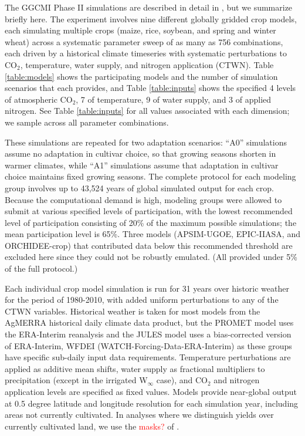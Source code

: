 \documentclass[gmd, manuscript]{copernicus} %
\begin{document}
The GGCMI Phase II simulations are described in detail in \citet{Franke2019a}, but we summarize briefly here. 
The experiment involves nine different globally gridded crop models, each simulating multiple crops (maize, rice, soybean, and spring and winter wheat) across a systematic parameter sweep of as many as 756 combinations, each driven by a historical climate timeseries with systematic perturbations to CO$_2$, temperature, water supply, and nitrogen application (CTWN). 
Table \ref{table:models} shows the participating models and the number of simulation scenarios that each provides, and Table \ref{table:inputs} shows the specified 4 levels of atmospheric CO$_2$, 7 of temperature, 9 of water supply, and 3 of applied nitrogen. 
See Table \ref{table:inputs} for all values associated with each dimension; we sample across all parameter combinations.

These simulations are repeated for two adaptation scenarios: ``A0'' simulations assume no adaptation in cultivar choice, so that growing seasons shorten in warmer climates, while ``A1'' simulations assume that adaptation in cultivar choice maintains fixed growing seasons. 
The complete protocol for each modeling group involves up to 43,524 years of global simulated output for each crop. 
Because the computational demand is high, modeling groups were allowed to submit at various specified levels of participation, with the lowest recommended level of participation consisting of 20\% of the maximum possible simulations; the mean participation level is 65\%. 
Three models (APSIM-UGOE, EPIC-IIASA, and ORCHIDEE-crop) that contributed data %
below this recommended threshold are excluded here since they could not be robustly emulated. (All provided under 5\% of the full protocol.) 

Each individual crop model simulation is run for 31 years over historic weather for the period of 1980-2010, with added uniform perturbations to any of the CTWN variables.
Historical weather is taken for most models from the AgMERRA \citep{Ruane2015} historical daily climate data product, but the PROMET model uses the ERA-Interim reanalysis \citep{dee2011era} and the JULES model uses a bias-corrected version of ERA-Interim, WFDEI (WATCH-Forcing-Data-ERA-Interim) \citep{weedon2014wfdei} as these groups have specific sub-daily input data requirements. 
Temperature perturbations are applied as additive mean shifts, water supply as fractional multipliers to precipitation (except in the irrigated W$_{\infty}$ case), and CO$_2$ and nitrogen application levels are specified as fixed values. 
Models provide near-global output at 0.5 degree latitude and longitude resolution for each simulation year, including areas not currently cultivated. In analyses where we distinguish yields over currently cultivated land, we use the \textcolor{red}{masks?} of \citet{Portmann2010}.
\end{document}
